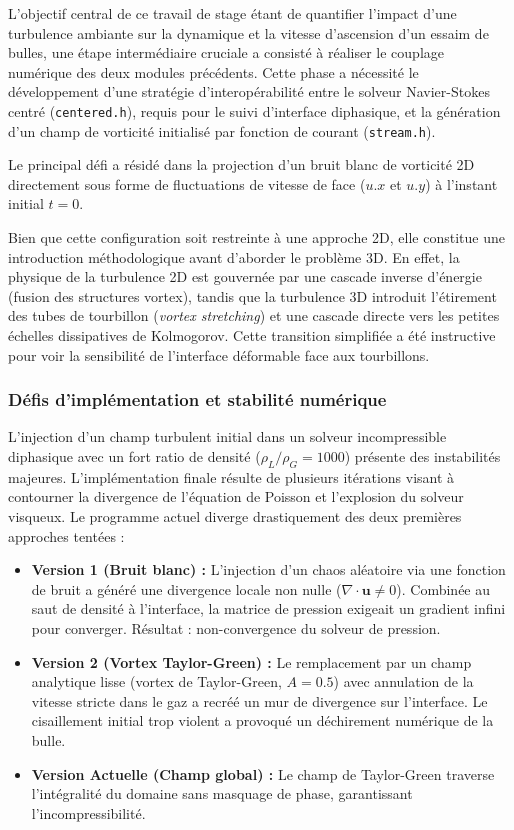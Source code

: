 L'objectif central de ce travail de stage étant de quantifier l'impact d'une turbulence ambiante sur la dynamique et la vitesse d'ascension d'un essaim de bulles, une étape intermédiaire cruciale a consisté à réaliser le couplage numérique des deux modules précédents. Cette phase a nécessité le développement d'une stratégie d'interopérabilité entre le solveur Navier-Stokes centré (\texttt{centered.h}), requis pour le suivi d'interface diphasique, et la génération d'un champ de vorticité initialisé par fonction de courant (\texttt{stream.h}).

 Le principal défi a résidé dans la projection d'un bruit blanc de vorticité 2D directement sous forme de fluctuations de vitesse de face ($u.x$ et $u.y$) à l'instant initial $t=0$.

Bien que cette configuration soit restreinte à une approche 2D, elle constitue une introduction méthodologique avant d'aborder le problème 3D. En effet, la physique de la turbulence 2D est gouvernée par une cascade inverse d'énergie (fusion des structures vortex), tandis que la turbulence 3D introduit l'étirement des tubes de tourbillon (\textit{vortex stretching}) et une cascade directe vers les petites échelles dissipatives de Kolmogorov. Cette transition simplifiée a été instructive pour voir la sensibilité de l'interface déformable face aux tourbillons.

\subsubsection{Défis d'implémentation et stabilité numérique}
L'injection d'un champ turbulent initial dans un solveur incompressible diphasique avec un fort ratio de densité ($\rho_L/\rho_G = 1000$) présente des instabilités majeures. L'implémentation finale résulte de plusieurs itérations visant à contourner la divergence de l'équation de Poisson et l'explosion du solveur visqueux. Le programme actuel diverge drastiquement des deux premières approches tentées :

\begin{itemize}
    \item \textbf{Version 1 (Bruit blanc) :} L'injection d'un chaos aléatoire via une fonction de bruit a généré une divergence locale non nulle ($\nabla \cdot \mathbf{u} \neq 0$). Combinée au saut de densité à l'interface, la matrice de pression exigeait un gradient infini pour converger. Résultat : non-convergence du solveur de pression.
    \item \textbf{Version 2 (Vortex Taylor-Green) :} Le remplacement par un champ analytique lisse (vortex de Taylor-Green, $A=0.5$) avec annulation de la vitesse stricte dans le gaz a recréé un mur de divergence sur l'interface. Le cisaillement initial trop violent a provoqué un déchirement numérique de la bulle.
    \item \textbf{Version Actuelle (Champ global) :} Le champ de Taylor-Green traverse l'intégralité du domaine sans masquage de phase, garantissant l'incompressibilité.
\end{itemize}

